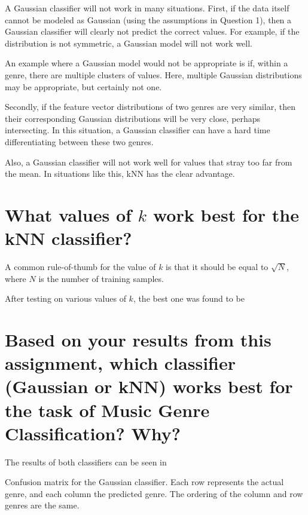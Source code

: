 \documentclass[a4paper,titlepage]{article}
\begin{document}
	
	A Gaussian classifier will not work in many situations. First, if the data itself cannot be modeled as Gaussian (using the assumptions in Question 1), then a Gaussian classifier will clearly not predict the correct values. For example, if the distribution is not symmetric, a Gaussian model will not work well.
	
	An example where a Gaussian model would not be appropriate is if, within a genre, there are multiple clusters of values. Here, multiple Gaussian distributions may be appropriate, but certainly not one.
	
	Secondly, if the feature vector distributions of two genres are very similar, then their corresponding Gaussian distributions will be very close, perhaps intersecting. In this situation, a Gaussian classifier can have a hard time differentiating between these two genres.
	
	Also, a Gaussian classifier will not work well for values that stray too far from the mean. In situations like this, kNN has the clear advantage.
	
	\section{What values of $k$ work best for the kNN classifier?}
	
	A common rule-of-thumb for the value of $k$ is that it should be equal to $\sqrt{N}$, where $N$ is the number of training samples. %
	
	After testing on various values of $k$, the best one was found to be %
	
	\section{Based on your results from this assignment, which classifier (Gaussian or kNN) works best for the task of Music Genre Classification? Why?}
	
	The results of both classifiers can be seen in %
	
	\begin{table}[!htb]
		\centering
		\caption{Confusion matrix for the Gaussian classifier. Each row represents the actual genre, and each column the predicted genre. The ordering of the column and row genres are the same.}
		\label{table:confusion_gaussian}
	\end{table}
\end{document}

